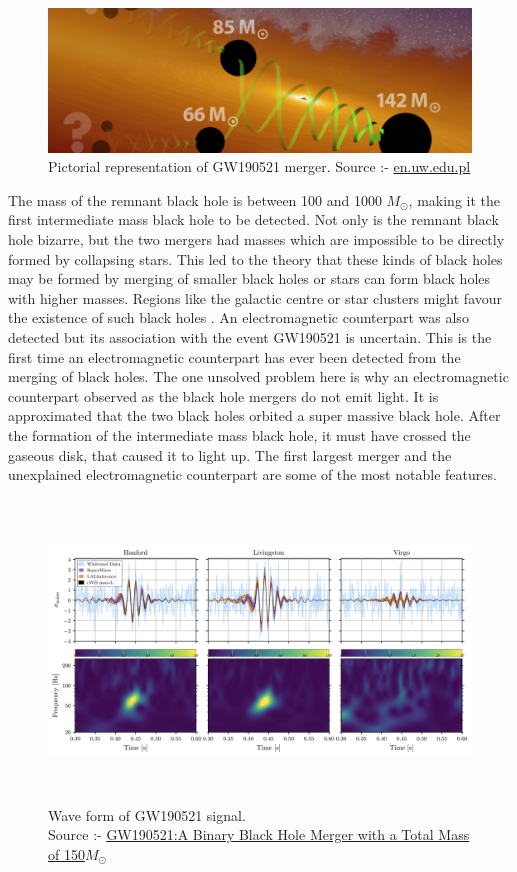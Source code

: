 \begin{figure}[h]
    \centering
    \includegraphics[scale = 0.5]{images.tex/GW190521 representation.jpg}
    \caption{Pictorial representation of GW190521 merger. Source :- \href{https://en.uw.edu.pl/virgo-and-ligo-unveil-new-and-unexpected-black-hole-populations/}{en.uw.edu.pl}}
\end{figure}

The mass of the remnant black hole is between 100 and 1000 $M_\odot$, making it the first intermediate mass black hole to be detected. Not only is the remnant black hole bizarre, but the two mergers had masses which are impossible to be directly formed by collapsing stars. This led to the theory that these kinds of black holes may be formed by merging of smaller black holes or stars can form black holes with higher masses. Regions like the galactic centre or star clusters might favour the existence of such black holes \cite{GW190521_2}. An electromagnetic counterpart was also detected but its association with the event GW190521 is uncertain. This is the first time an electromagnetic counterpart has ever been detected from the merging of black holes. The one unsolved problem here is why an electromagnetic counterpart observed as the black hole mergers do not emit light. It is approximated that the two black holes orbited a super massive black hole. After the formation of the intermediate mass black hole, it must have crossed the gaseous disk, that caused it to light up. The first largest merger and the unexplained electromagnetic counterpart are some of the most notable features.


\begin{figure}[h]
    \centering
    \includegraphics[width=15cm, height = 8cm]{images.tex/GW190521.png}
    \caption{Wave form of GW190521 signal. \\ Source :- \href{https://journals.aps.org/prl/abstract/10.1103/PhysRevLett.125.101102}{GW190521:A Binary Black Hole Merger with a Total Mass of 150$M_\odot$}}
\end{figure}

